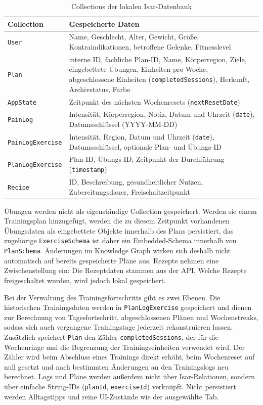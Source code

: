 \begin{table}[H]
    \centering
    \begin{tabular}{lp{10.5cm}}
        \hline
        \textbf{Collection} & \textbf{Gespeicherte Daten} \\
        \hline
        \texttt{User} & Name, Geschlecht, Alter, Gewicht, Größe, Kontraindikationen, betroffene Gelenke, Fitnesslevel \\
        \texttt{Plan} & interne ID, fachliche Plan-ID, Name, Körperregion, Ziele, eingebettete Übungen, Einheiten pro Woche, abgeschlossene Einheiten (\texttt{completedSessions}), Herkunft, Archivstatus, Farbe \\
        \texttt{AppState} & Zeitpunkt des nächsten Wochenresets (\texttt{nextResetDate}) \\
        \texttt{PainLog} & Intensität, Körperregion, Notiz, Datum und Uhrzeit (\texttt{date}), Datumsschlüssel (YYYY-MM-DD) \\
        \texttt{PainLogExercise} & Intensität, Region, Datum und Uhrzeit (\texttt{date}), Datumsschlüssel, optionale Plan- und Übungs-ID \\
        \texttt{PlanLogExercise} & Plan-ID, Übungs-ID, Zeitpunkt der Durchführung (\texttt{timestamp}) \\
        \texttt{Recipe} & ID, Beschreibung, gesundheitlicher Nutzen, Zubereitungsdauer, Freischaltzeitpunkt \\
        \hline
    \end{tabular}
    \caption{Collections der lokalen Isar-Datenbank}
    \label{tab:isar_collections}
\end{table}

Übungen werden nicht als eigenständige Collection gespeichert. Werden sie einem Trainingsplan hinzugefügt, werden die zu diesem Zeitpunkt vorhandenen Übungsdaten als eingebettete Objekte innerhalb des Plans persistiert, das zugehörige \texttt{ExerciseSchema} ist daher ein Embedded-Schema innerhalb von \texttt{PlanSchema}. Änderungen im Knowledge Graph wirken sich deshalb nicht automatisch auf bereits gespeicherte Pläne aus. Rezepte nehmen eine Zwischenstellung ein: Die Rezeptdaten stammen aus der API. Welche Rezepte freigeschaltet wurden, wird jedoch lokal gespeichert.

Bei der Verwaltung des Trainingsfortschritts gibt es zwei Ebenen. Die historischen Trainingsdaten werden in \texttt{PlanLogExercise} gespeichert und dienen zur Berechnung von Tagesfortschritt, abgeschlossenen Plänen und Wochenstreaks, sodass sich auch vergangene Trainingstage jederzeit rekonstruieren lassen. Zusätzlich speichert \texttt{Plan} den Zähler \texttt{completedSessions}, der für die Wochenringe und die Begrenzung der Trainingseinheiten verwendet wird. Der Zähler wird beim Abschluss eines Trainings direkt erhöht, beim Wochenreset auf null gesetzt und nach bestimmten Änderungen an den Trainingslogs neu berechnet. Logs und Pläne werden außerdem nicht über Isar-Relationen, sondern über einfache String-IDs (\texttt{planId}, \texttt{exerciseId}) verknüpft. Nicht persistiert werden Alltagstipps und reine UI-Zustände wie der ausgewählte Tab.

